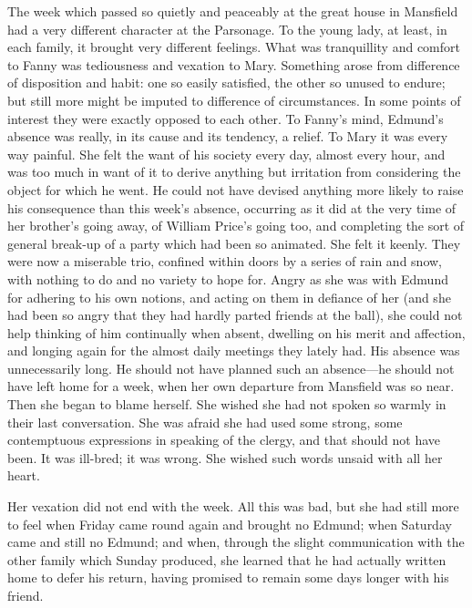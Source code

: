 The week which passed so quietly and peaceably at the great house in Mansfield had a very different character at the Parsonage. To the young lady, at least, in each family, it brought very different feelings. What was tranquillity and comfort to Fanny was tediousness and vexation to Mary. Something arose from difference of disposition and habit: one so easily satisfied, the other so unused to endure; but still more might be imputed to difference of circumstances. In some points of interest they were exactly opposed to each other. To Fanny's mind, Edmund's absence was really, in its cause and its tendency, a relief. To Mary it was every way painful. She felt the want of his society every day, almost every hour, and was too much in want of it to derive anything but irritation from considering the object for which he went. He could not have devised anything more likely to raise his consequence than this week's absence, occurring as it did at the very time of her brother's going away, of William Price's going too, and completing the sort of general break-up of a party which had been so animated. She felt it keenly. They were now a miserable trio, confined within doors by a series of rain and snow, with nothing to do and no variety to hope for. Angry as she was with Edmund for adhering to his own notions, and acting on them in defiance of her (and she had been so angry that they had hardly parted friends at the ball), she could not help thinking of him continually when absent, dwelling on his merit and affection, and longing again for the almost daily meetings they lately had. His absence was unnecessarily long. He should not have planned such an absence—he should not have left home for a week, when her own departure from Mansfield was so near. Then she began to blame herself. She wished she had not spoken so warmly in their last conversation. She was afraid she had used some strong, some contemptuous expressions in speaking of the clergy, and that should not have been. It was ill-bred; it was wrong. She wished such words unsaid with all her heart.

Her vexation did not end with the week. All this was bad, but she had still more to feel when Friday came round again and brought no Edmund; when Saturday came and still no Edmund; and when, through the slight communication with the other family which Sunday produced, she learned that he had actually written home to defer his return, having promised to remain some days longer with his friend.

